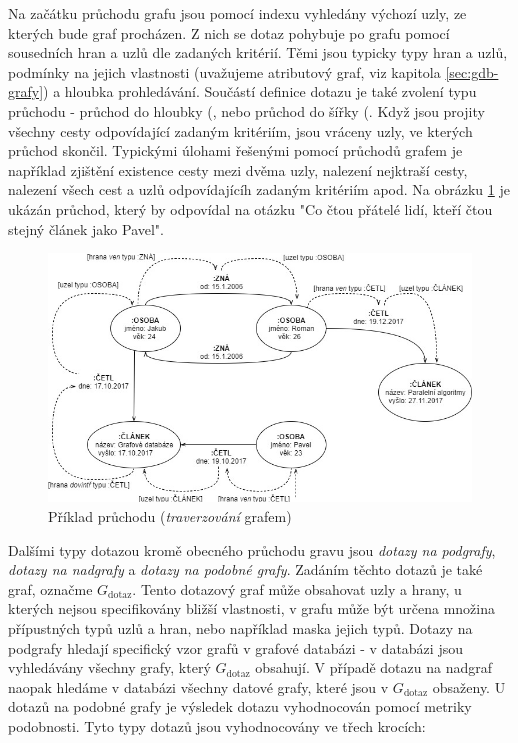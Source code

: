 Na začátku průchodu grafu jsou pomocí indexu vyhledány výchozí uzly, ze kterých bude graf procházen. Z nich se dotaz pohybuje po grafu pomocí sousedních hran a uzlů dle zadaných kritérií. Těmi jsou typicky typy hran a uzlů, podmínky na jejich vlastnosti (uvažujeme atributový graf, viz kapitola \ref{sec:gdb-grafy}) a hloubka prohledávání. Součástí definice dotazu je také zvolení typu průchodu - průchod do hloubky (\textit{}, nebo průchod do šířky (\textit{}. Když jsou projity všechny cesty odpovídající zadaným kritériím, jsou vráceny uzly, ve kterých průchod skončil. Typickými úlohami řešenými pomocí průchodů grafem je například zjištění existence cesty mezi dvěma uzly, nalezení nejktraší cesty, nalezení všech cest a uzlů odpovídajícíh zadaným kritériím apod. Na obrázku \ref{fig:traversal} je ukázán průchod, který by odpovídal na otázku "Co čtou přátelé lidí, kteří čtou stejný článek jako Pavel". 

\begin{figure}
\begin{center}
\includegraphics[width=14cm]{figures/traversal}
\caption{Příklad průchodu (\textit{traverzování} grafem)}
\label{fig:traversal}
\end{center}
\end{figure}

Dalšími typy dotazou kromě obecného průchodu gravu jsou \textit{dotazy na podgrafy}, \textit{dotazy na nadgrafy} a \textit{dotazy na podobné grafy}. Zadáním těchto dotazů je také graf, označme \textit{$G_\mathrm{dotaz}$}. Tento dotazový graf může obsahovat uzly a hrany, u kterých nejsou specifikovány bližší vlastnosti, v grafu může být určena množina přípustných typů uzlů a hran, nebo například maska jejich typů. Dotazy na podgrafy hledají specifický vzor grafů v grafové databázi - v databázi jsou vyhledávány všechny grafy, který \textit{$G_\mathrm{dotaz}$} obsahují. V případě dotazu na nadgraf naopak hledáme v databázi všechny datové grafy, které jsou v \textit{$G_\mathrm{dotaz}$} obsaženy. U dotazů na podobné grafy je výsledek dotazu vyhodnocován pomocí metriky podobnosti.\cite{Koutra11} Tyto typy dotazů jsou vyhodnocovány ve třech krocích: 

